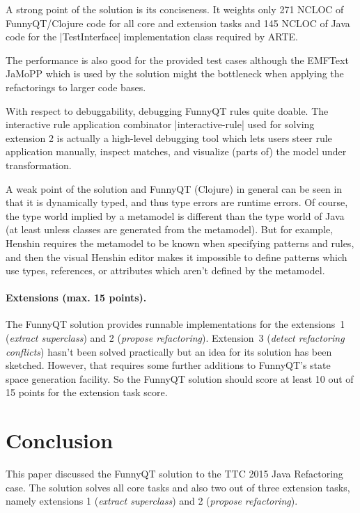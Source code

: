 \documentclass[submission]{eptcs}
\newcommand{\code}{\clojureinline}
\begin{document}
A strong point of the solution is its conciseness.  It weights only 271 NCLOC
of FunnyQT/Clojure code for all core and extension tasks and 145 NCLOC of Java
code for the \code|TestInterface| implementation class required by ARTE.

The performance is also good for the provided test cases although the EMFText
JaMoPP which is used by the solution might the bottleneck when applying the
refactorings to larger code bases.

With respect to debuggability, debugging FunnyQT rules quite doable.  The
interactive rule application combinator \code|interactive-rule| used for
solving extension 2 is actually a high-level debugging tool which lets users
steer rule application manually, inspect matches, and visualize (parts of) the
model under transformation.

A weak point of the solution and FunnyQT (Clojure) in general can be seen in
that it is dynamically typed, and thus type errors are runtime errors.  Of
course, the type world implied by a metamodel is different than the type world
of Java (at least unless classes are generated from the metamodel).  But for
example, Henshin requires the metamodel to be known when specifying patterns
and rules, and then the visual Henshin editor makes it impossible to define
patterns which use types, references, or attributes which aren't defined by the
metamodel.


\paragraph{Extensions (max. 15 points).}

The FunnyQT solution provides runnable implementations for the extensions~1
(\emph{extract superclass}) and 2 (\emph{propose refactoring}).  Extension~3
(\emph{detect refactoring conflicts}) hasn't been solved practically but an
idea for its solution has been sketched.  However, that requires some further
additions to FunnyQT's state space generation facility.  So the FunnyQT
solution should score at least 10 out of 15 points for the extension task
score.


\section{Conclusion}
\label{sec:conclusion}

This paper discussed the FunnyQT solution to the TTC 2015 Java Refactoring
case.  The solution solves all core tasks and also two out of three extension
tasks, namely extensions 1 (\emph{extract superclass}) and 2 (\emph{propose
  refactoring}).
\end{document}
